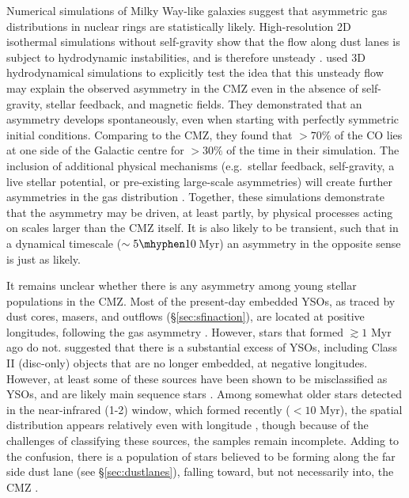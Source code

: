 Numerical simulations of Milky Way-like galaxies suggest that asymmetric gas distributions in nuclear rings are statistically likely. High-resolution 2D isothermal simulations without self-gravity show that the flow along dust lanes is subject to hydrodynamic instabilities, and is therefore unsteady \citep{Kim2012c,Sormani2015c}. \cite{Sormani2018b} used 3D hydrodynamical simulations to explicitly test the idea that this unsteady flow may explain the observed asymmetry in the CMZ even in the absence of self-gravity, stellar feedback, and magnetic fields. They demonstrated that an asymmetry develops spontaneously, even when starting with perfectly symmetric initial conditions. Comparing to the CMZ, they found that $>70\%$ of the CO lies at one side of the Galactic centre for $>30\%$ of the time in their simulation. 
The inclusion of additional physical mechanisms (e.g.\ stellar feedback, self-gravity, a live stellar potential, or pre-existing large-scale asymmetries) will create further asymmetries in the gas distribution \citep{Fux1999, Rodriguez-Fernandez2008, Emsellem2015, Torrey2017, Armillotta2020}.
Together, these simulations demonstrate that the asymmetry may be driven, at least partly, by physical processes acting on scales larger than the CMZ itself. It is also likely to be transient, such that in a dynamical timescale ($\sim5\mhyphen10$\,Myr) an asymmetry in the opposite sense is just as likely. 

It remains unclear whether there is any asymmetry among young stellar populations in the CMZ.
Most of the present-day embedded YSOs, as traced by dust cores, masers, and outflows (\S\ref{sec:sfinaction}), are located at positive longitudes, following the gas asymmetry \citep[\S\ref{sec:incipientsf}; ][]{Ginsburg2018b,Rickert2019,Hatchfield2020,Lu2019a,Lu2019b,Lu2020,Lu2021,Walker2021}. 
However, stars that formed $\gtrsim1$ Myr ago do not.
\citet{Yusef-Zadeh2009} suggested that there is a substantial excess of YSOs, including Class II (disc-only) objects that are no longer embedded, at negative longitudes.
However, at least some of these sources have been shown to be misclassified as YSOs, and are likely main sequence stars \citep[][see \S\ref{subsec:SFR:current}]{An2011, Koepferl2015}.
Among somewhat older stars detected in the near-infrared (1-2\um) window, which formed recently ($<10$ Myr), the spatial distribution appears relatively even with longitude \citep{Nandakumar2018,Clark2021}, though because of the challenges of classifying these sources, the samples remain incomplete. 
Adding to the confusion, there is a population of stars believed to be forming along the far side dust lane (see \S\ref{sec:dustlanes}), falling toward, but not necessarily into, the CMZ \citep{Anderson2020}.

